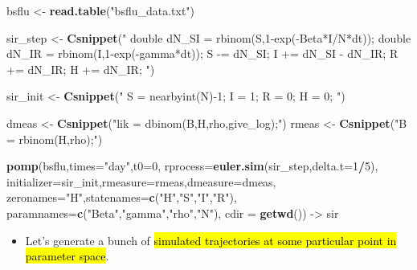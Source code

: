 \documentclass[]{article}
\newenvironment{Shaded}{\begin{snugshade}}{\end{snugshade}}
\newcommand{\KeywordTok}[1]{\textcolor[rgb]{0.13,0.29,0.53}{\textbf{#1}}}
\newcommand{\DataTypeTok}[1]{\textcolor[rgb]{0.13,0.29,0.53}{#1}}
\newcommand{\DecValTok}[1]{\textcolor[rgb]{0.00,0.00,0.81}{#1}}
\newcommand{\StringTok}[1]{\textcolor[rgb]{0.31,0.60,0.02}{#1}}
\newcommand{\OperatorTok}[1]{\textcolor[rgb]{0.81,0.36,0.00}{\textbf{#1}}}
\newcommand{\NormalTok}[1]{#1}
\providecommand{\tightlist}{%
  \setlength{\itemsep}{0pt}\setlength{\parskip}{0pt}}
\begin{document}
\begin{Shaded}
\begin{Highlighting}[]
\NormalTok{bsflu <-}\StringTok{ }\KeywordTok{read.table}\NormalTok{(}\StringTok{"bsflu_data.txt"}\NormalTok{)}

\NormalTok{sir_step <-}\StringTok{ }\KeywordTok{Csnippet}\NormalTok{(}\StringTok{"}
\StringTok{  double dN_SI = rbinom(S,1-exp(-Beta*I/N*dt));}
\StringTok{  double dN_IR = rbinom(I,1-exp(-gamma*dt));}
\StringTok{  S -= dN_SI;}
\StringTok{  I += dN_SI - dN_IR;}
\StringTok{  R += dN_IR;}
\StringTok{  H += dN_IR;}
\StringTok{"}\NormalTok{)}

\NormalTok{sir_init <-}\StringTok{ }\KeywordTok{Csnippet}\NormalTok{(}\StringTok{"}
\StringTok{  S = nearbyint(N)-1;}
\StringTok{  I = 1;}
\StringTok{  R = 0;}
\StringTok{  H = 0;}
\StringTok{"}\NormalTok{)}

\NormalTok{dmeas <-}\StringTok{ }\KeywordTok{Csnippet}\NormalTok{(}\StringTok{"lik = dbinom(B,H,rho,give_log);"}\NormalTok{)}
\NormalTok{rmeas <-}\StringTok{ }\KeywordTok{Csnippet}\NormalTok{(}\StringTok{"B = rbinom(H,rho);"}\NormalTok{)}

\KeywordTok{pomp}\NormalTok{(bsflu,}\DataTypeTok{times=}\StringTok{"day"}\NormalTok{,}\DataTypeTok{t0=}\DecValTok{0}\NormalTok{,}
     \DataTypeTok{rprocess=}\KeywordTok{euler.sim}\NormalTok{(sir_step,}\DataTypeTok{delta.t=}\DecValTok{1}\OperatorTok{/}\DecValTok{5}\NormalTok{),}
     \DataTypeTok{initializer=}\NormalTok{sir_init,}\DataTypeTok{rmeasure=}\NormalTok{rmeas,}\DataTypeTok{dmeasure=}\NormalTok{dmeas,}
     \DataTypeTok{zeronames=}\StringTok{"H"}\NormalTok{,}\DataTypeTok{statenames=}\KeywordTok{c}\NormalTok{(}\StringTok{"H"}\NormalTok{,}\StringTok{"S"}\NormalTok{,}\StringTok{"I"}\NormalTok{,}\StringTok{"R"}\NormalTok{),}
     \DataTypeTok{paramnames=}\KeywordTok{c}\NormalTok{(}\StringTok{"Beta"}\NormalTok{,}\StringTok{"gamma"}\NormalTok{,}\StringTok{"rho"}\NormalTok{,}\StringTok{"N"}\NormalTok{),}
     \DataTypeTok{cdir =} \KeywordTok{getwd}\NormalTok{()) ->}\StringTok{ }\NormalTok{sir}
\end{Highlighting}
\end{Shaded}

\begin{itemize}
\tightlist
\item
  Let's generate a bunch of \hl{simulated trajectories at some particular
  point in parameter space}.
\end{itemize}
\end{document}
